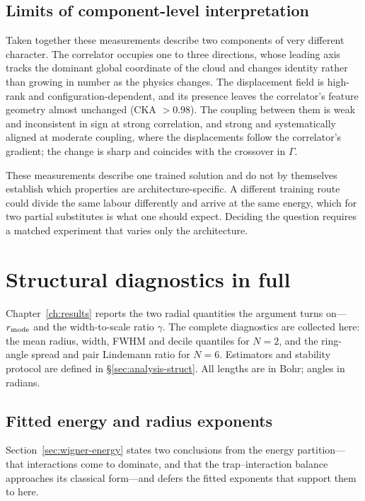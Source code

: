 
\section{Limits of component-level interpretation}
\label{sec:repr-synthesis}

Taken together these measurements describe two components of very different character. The
correlator occupies one to three directions, whose leading axis tracks the dominant global
coordinate of the cloud and changes identity rather than growing in number as the physics
changes. The displacement field is high-rank and configuration-dependent, and its presence
leaves the correlator's feature geometry almost unchanged (CKA $>0.98$). The coupling
between them is weak and inconsistent in sign at strong correlation, and strong and
systematically aligned at moderate coupling, where the displacements follow the
correlator's gradient; the change is sharp and coincides with the crossover in $\Gamma$.

These measurements describe one trained solution and do not by themselves establish which
properties are architecture-specific. A different training route could divide the same
labour differently and arrive at the same energy, which for two partial substitutes is what
one should expect. Deciding the question requires a matched experiment that varies only the
architecture.


\chapter{Structural diagnostics in full}
\label{app:structural-tables}

Chapter~\ref{ch:results} reports the two radial quantities the argument turns
on---$r_{\rm mode}$ and the width-to-scale ratio $\gamma$. The complete diagnostics are
collected here: the mean radius, width, FWHM and decile quantiles for $N{=}2$, and the
ring-angle spread and pair Lindemann ratio for $N{=}6$. Estimators and stability
protocol are defined in \S\ref{sec:analysis-struct}. All lengths are in Bohr; angles in
radians.

\section{Fitted energy and radius exponents}
\label{app:energy-exponents}

Section~\ref{sec:wigner-energy} states two conclusions from the energy partition---that
interactions come to dominate, and that the trap--interaction balance approaches its
classical form---and defers the fitted exponents that support them to here.

